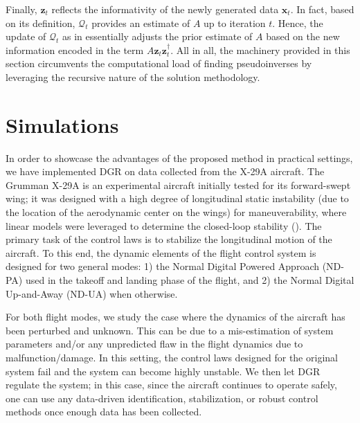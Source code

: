 \documentclass[journal]{IEEEtran}
\theoremstyle{definition}
\theoremstyle{remark}
\newcommand\x{{\bm x}}
\def\u{{\bm u}}
\newcommand\z{{\bm z}}
\begin{document}
Finally, $\z_t$ reflects the informativity of the newly generated data $\x_t$.
%
In fact, based on its definition, $\mathcal{Q}_t$ provides an estimate of $A$ up to iteration $t$.
%
Hence, the update of $\mathcal{Q}_t$ as in  essentially adjusts the prior estimate of $A$ based on the new information encoded in the term $A \z_t\z_t^\dagger$.
%
%
All in all, the machinery provided in this section circumvents the computational load of finding 
pseudoinverses by leveraging the recursive nature of the solution methodology.

\section{Simulations}
\label{sec:simulation}

    In order to showcase the advantages of the proposed method in practical settings, 
    we have implemented \ac{DGR} on data collected from the X-29A aircraft.
    The Grumman X-29A is an experimental aircraft initially tested for its forward-swept wing;
    it was designed with a high degree of longitudinal static instability (due to the location of the aerodynamic center on the wings) for maneuverability, where linear models were leveraged to determine the closed-loop stability ().
    The primary task of the control laws is to stabilize the longitudinal motion of the aircraft.
    To this end, the dynamic elements of the flight control system is designed for two general modes: 1) the Normal Digital Powered Approach (ND-PA) used in the takeoff and landing phase of the flight, and 2) the Normal Digital Up-and-Away (ND-UA) when otherwise.
    
    
   For both flight modes, we study the case where the dynamics of the aircraft has been perturbed and unknown.
   This can be due to a mis-estimation of system parameters and/or any unpredicted flaw in the flight dynamics due to malfunction/damage.
   In this setting, the control laws designed for the original system fail and the system can become highly unstable.
   We then let \ac{DGR} regulate the system; in this case, since the aircraft continues to operate safely, one can use any data-driven identification, stabilization, or robust control methods once enough data has been collected.
\end{document}
